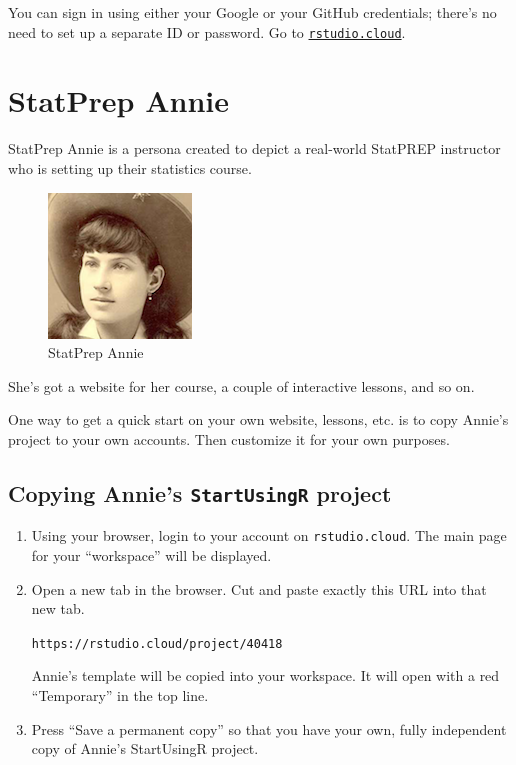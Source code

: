 \documentclass[]{book}
\theoremstyle{definition}
\theoremstyle{definition}
\theoremstyle{definition}
\theoremstyle{remark}
\begin{document}
You can sign in using either your Google or your GitHub credentials;
there's no need to set up a separate ID or password. Go to
\href{rstudio.cloud}{\texttt{rstudio.cloud}}.

\chapter{StatPrep Annie}\label{statprep-annie}

StatPrep Annie is a persona created to depict a real-world StatPREP
instructor who is setting up their statistics course.

\begin{figure}

{\centering \includegraphics{images/Annie-thumbnail} 

}

\caption{StatPrep Annie}\label{fig:unnamed-chunk-1}
\end{figure}

She's got a website for her course, a couple of interactive lessons, and
so on.

One way to get a quick start on your own website, lessons, etc. is to
copy Annie's project to your own accounts. Then customize it for your
own purposes.

\section{\texorpdfstring{Copying Annie's \texttt{StartUsingR}
project}{Copying Annie's StartUsingR project}}\label{copying-annies-startusingr-project}

\begin{enumerate}
\def\labelenumi{\arabic{enumi}.}
\item
  Using your browser, login to your account on \texttt{rstudio.cloud}.
  The main page for your ``workspace'' will be displayed.
\item
  Open a new tab in the browser. Cut and paste exactly this URL into
  that new tab.

  \texttt{https://rstudio.cloud/project/40418}

  Annie's template will be copied into your workspace. It will open with
  a red ``Temporary'' in the top line.
\item
  Press ``Save a permanent copy'' so that you have your own, fully
  independent copy of Annie's StartUsingR project.
\end{enumerate}
\end{document}
